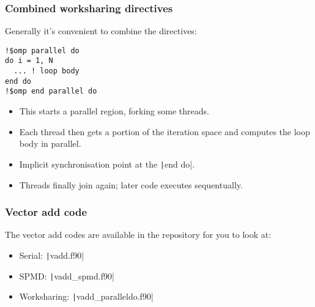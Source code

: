 \documentclass{beamer}
\begin{document}

\begin{frame}[fragile]
\frametitle{Combined worksharing directives}
Generally it's convenient to combine the directives:
\begin{verbatim}
!$omp parallel do
do i = 1, N
  ... ! loop body
end do
!$omp end parallel do
\end{verbatim}

\begin{itemize}
  \item This starts a parallel region, forking some threads.
  \item Each thread then gets a portion of the iteration space and computes the loop body in parallel.
  \item Implicit synchronisation point at the \texttt|end do|.
  \item Threads finally join again; later code executes sequentually.
\end{itemize}
\end{frame}

\begin{frame}
\frametitle{Vector add code}
The vector add codes are available in the repository for you to look at:
\begin{itemize}
  \item Serial: \texttt|vadd.f90|
  \item SPMD: \texttt|vadd_spmd.f90|
  \item Worksharing: \texttt|vadd_paralleldo.f90|
\end{itemize}
\end{frame}
\end{document}

